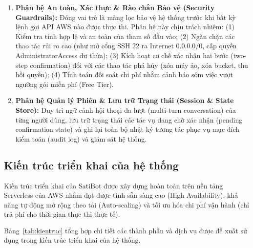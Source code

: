 \documentclass[a4paper,12pt]{article}
\begin{document}
\begin{enumerate}
  \item \textbf{Phân hệ An toàn, Xác thực \& Rào chắn Bảo vệ (Security Guardrails):}
  Đóng vai trò là màng lọc bảo vệ hệ thống trước khi bất kỳ lệnh gọi API AWS nào được thực thi. Phân hệ này chịu trách nhiệm: (1) Kiểm tra tính hợp lệ và an toàn của tham số đầu vào; (2) Ngăn chặn các thao tác rủi ro cao (như mở cổng SSH 22 ra Internet 0.0.0.0/0, cấp quyền AdministratorAccess dư thừa); (3) Kích hoạt cơ chế xác nhận hai bước (two-step confirmation) đối với các thao tác phá hủy (xóa máy ảo, xóa bucket, thu hồi quyền); (4) Tính toán đối soát chi phí nhằm cảnh báo sớm việc vượt ngưỡng gói miễn phí (Free Tier).

  \item \textbf{Phân hệ Quản lý Phiên \& Lưu trữ Trạng thái (Session \& State Store):}
  Duy trì ngữ cảnh hội thoại đa lượt (multi-turn conversation) của từng người dùng, lưu trữ trạng thái các tác vụ đang chờ xác nhận (pending confirmation state) và ghi lại toàn bộ nhật ký tương tác phục vụ mục đích kiểm toán (audit log) và giám sát hệ thống.
\end{enumerate}

\subsection{Kiến trúc triển khai của hệ thống}

Kiến trúc triển khai của SatiBot được xây dựng hoàn toàn trên nền tảng Serverless của AWS nhằm đạt được tính sẵn sàng cao (High Availability), khả năng tự động mở rộng theo tải (Auto-scaling) và tối ưu hóa chi phí vận hành (chỉ trả phí cho thời gian thực thi thực tế).

Bảng~\ref{tab:kientruc} tổng hợp chi tiết các thành phần và dịch vụ được đề xuất sử dụng trong kiến trúc triển khai của hệ thống.
\end{document}
